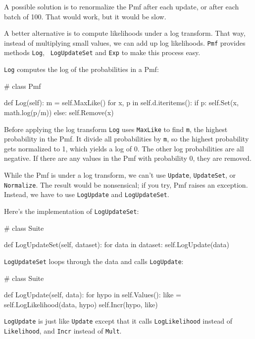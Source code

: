 \documentclass[12pt]{book}
\theoremstyle{exercise}
\begin{document}
A possible solution is to renormalize the Pmf after each update,
or after each batch of 100.  That would work, but it would be slow.

A better alternative is to compute likelihoods under a log
transform.  That way, instead of multiplying small values, we can add
up log likelihoods.  {\tt Pmf} provides methods {\tt Log}, {\tt
  LogUpdateSet} and {\tt Exp} to make this process easy.

{\tt Log} computes the log of the probabilities in a Pmf:

\begin{code}
# class Pmf

    def Log(self):
        m = self.MaxLike()
        for x, p in self.d.iteritems():
            if p:
                self.Set(x, math.log(p/m))
            else:
                self.Remove(x)
\end{code}

Before applying the log transform {\tt Log} uses {\tt MaxLike} to find
{\tt m}, the highest probability in the Pmf.  It divide all
probabilities by {\tt m}, so the highest probability gets normalized
to 1, which yields a log of 0.  The other log probabilities are all
negative.  If there are any values in the Pmf with probability 0, they
are removed.

While the Pmf is under a log transform, we can't use {\tt Update},
{\tt UpdateSet}, or {\tt Normalize}.  The result would be nonsensical;
if you try, Pmf raises an exception.
Instead, we have to use {\tt LogUpdate}
and {\tt LogUpdateSet}.  

Here's the implementation of {\tt LogUpdateSet}:

\begin{code}
# class Suite

    def LogUpdateSet(self, dataset):
        for data in dataset:
            self.LogUpdate(data)
\end{code}

{\tt LogUpdateSet} loops through the data and calls {\tt LogUpdate}:

\begin{code}
# class Suite

    def LogUpdate(self, data):
        for hypo in self.Values():
            like = self.LogLikelihood(data, hypo)
            self.Incr(hypo, like)
\end{code}

{\tt LogUpdate} is just like {\tt Update} except that it calls
{\tt LogLikelihood} instead of {\tt Likelihood}, and {\tt Incr}
instead of {\tt Mult}.
\end{document}
